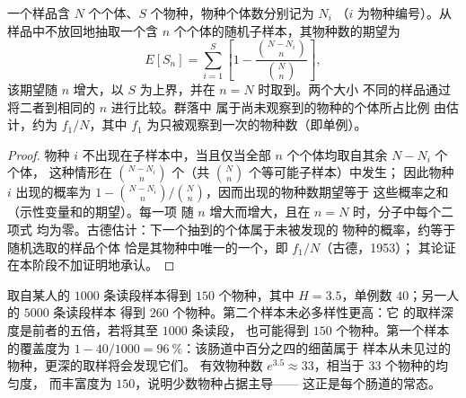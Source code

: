 \begin{theorem}[稀疏化]\label{thm:b3:microbiomes:rarefaction}
一个样品含 $N$ 个个体、$S$ 个物种，物种个体数分别记为 $N_{i}$
（$i$ 为物种编号）。从样品中不放回地抽取一个含 $n$
个个体的随机子样本，其物种数的期望为
\[
E[S_{n}] = \sum_{i=1}^{S}\left[1 - \frac{\binom{N - N_{i}}{n}}
{\binom{N}{n}}\right],
\]
该期望随 $n$ 增大，以 $S$ 为上界，并在 $n = N$ 时取到。两个大小
不同的样品通过将二者到相同的 $n$ 进行比较。群落中
属于尚未观察到的物种的个体所占比例
由\emph{}估计，约为 $f_{1}/N$，其中
$f_{1}$ 为只被观察到一次的物种数（即单例）。
\end{theorem}
\begin{proof}
物种 $i$ 不出现在子样本中，当且仅当全部 $n$
个个体均取自其余 $N - N_{i}$ 个个体，
这种情形在 $\binom{N - N_{i}}{n}$ 个（共 $\binom{N}{n}$ 个等可能子样本）中发生；
因此物种 $i$ 出现的概率为 $1 - \binom{N-N_{i}}{n}/
\binom{N}{n}$，因而出现的物种数期望等于
这些概率之和（示性变量和的期望）。每一项
随 $n$ 增大而增大，且在 $n = N$ 时，分子中每个二项式
均为零。古德估计：下一个抽到的个体属于未被发现的
物种的概率，约等于随机选取的样品个体
恰是其物种中唯一的一个，即 $f_{1}/N$（古德，1953）；
其论证在本阶段不加证明地承认。
\end{proof}

\begin{example}[两个肠道]\label{ex:b3:microbiomes:two-guts}
取自某人的 $1000$ 条读段样本得到 $150$ 个物种，其中
$H = 3.5$，单例数 $40$；另一人的 $5000$ 条读段样本
得到 $260$ 个物种。第二个样本未必多样性更高：它
的取样深度是前者的五倍，若将其至 $1000$ 条读段，
也可能得到 $150$ 个物种。第一个样本的覆盖度为 $1 - 40/1000 =
\qty{96}{\%}$：该肠道中百分之四的细菌属于
样本从未见过的物种，更深的取样将会发现它们。
有效物种数 $e^{3.5} \approx 33$，相当于 33 个物种的均匀度，
而丰富度为 $150$，说明少数物种占据主导——
这正是每个肠道的常态。
\end{example}


